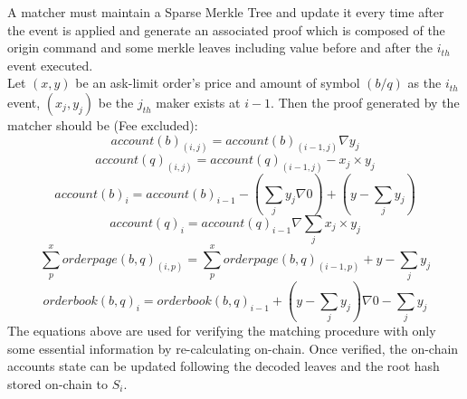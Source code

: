 \documentclass[a4paper,12pt]{article}
\begin{document}
A matcher must maintain a Sparse Merkle Tree and update it every time after the event is applied and generate an associated proof which is composed of the origin command and some merkle leaves including value before and after the \(i_{th}\) event executed.\\
Let \((x, y)\) be an ask-limit order's price and amount of symbol \((b/q)\) as the \(i_{th}\) event, \((x_{j}, y_{j})\) be the \(j_{th}\) maker exists at \(i-1\). Then the proof generated by the matcher should be (Fee excluded):\\
\begin{equation*}
    account(b)_{(i, j)}=account(b)_{(i-1,j)} \nabla y_{j}
\end{equation*}
\begin{equation*}
    account(q)_{(i, j)}=account(q)_{(i-1,j)} - x_{j} \times y_{j}
\end{equation*}
\begin{equation*}
    account(b)_{i}=account(b)_{i-1} - (\sum\limits_{j} y_{j} \nabla 0) + (y - \sum\limits_{j} y_{j})
\end{equation*}
\begin{equation*}
    account(q)_{i}=account(q)_{i-1} \nabla \sum\limits_{j} x_{j} \times y_{j}
\end{equation*}
\begin{equation*}
    \sum\limits_{p}^{x} orderpage(b,q)_{(i, p)} = \sum\limits_{p}^{x} orderpage(b,q)_{(i-1, p)} + y - \sum\limits_{j} y_{j}
\end{equation*}
\begin{equation*}
    orderbook(b,q)_{i}=orderbook(b,q)_{i-1} + (y - \sum\limits_{j} y_{j}) \nabla 0 - \sum\limits_{j} y_{j}
\end{equation*}
The equations above are used for verifying the matching procedure with only some essential information by re-calculating on-chain. Once verified, the on-chain accounts state can be updated following the decoded leaves and the root hash stored on-chain to \(S_{i}\).\\
\end{document}
